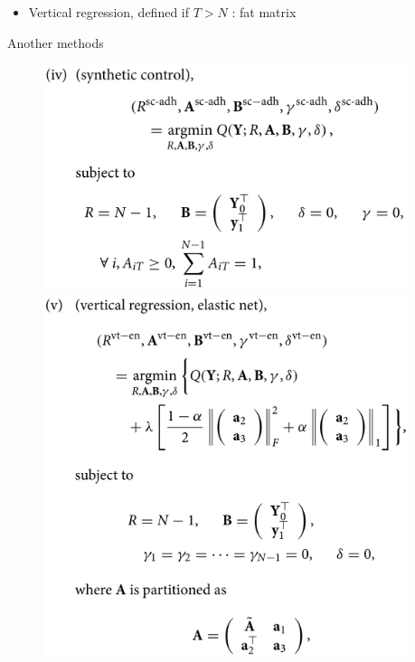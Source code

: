 \documentclass[xcolor=svgnames,aspectratio=169]{beamer}
\begin{document}
\begin{frame}
    \begin{itemize}
        \item Vertical regression, defined if $T>N$ : fat matrix
    \end{itemize}
\end{frame}

\begin{frame}{Another methods}
    \begin{figure}[h]
  \centering
  \begin{minipage}{0.43\columnwidth}
    \centering
    \includegraphics[width=0.95\textwidth, height=0.95\textheight, keepaspectratio]{SC.png}
  \end{minipage}
  \hspace{5mm}
  \begin{minipage}{0.43\columnwidth}
    \centering
    \includegraphics[width=0.95\textwidth, height=0.95\textheight, keepaspectratio]{Vt_EN.png}
  \end{minipage}
  \end{figure}
\end{frame}
\end{document}
